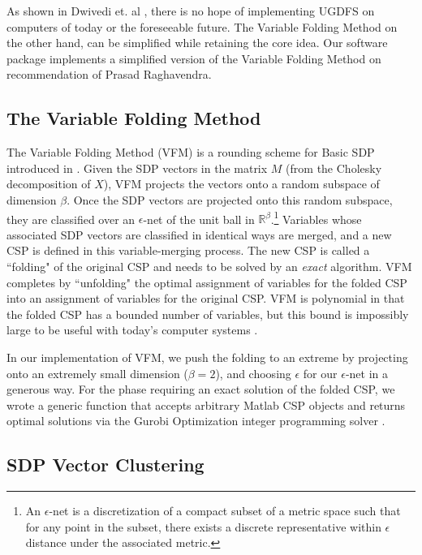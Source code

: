 \documentclass[12pt]{article} %
\begin{document}
As shown in Dwivedi et. al \cite{dwivedi2015introduction}, there is no hope of implementing UGDFS on computers of today or the foreseeable future. The Variable Folding Method on the other hand, can be simplified while retaining the core idea. Our software package implements a simplified version of the Variable Folding Method on recommendation of Prasad Raghavendra. 

\subsection{The Variable Folding Method}

The Variable Folding Method (VFM) is a rounding scheme for Basic SDP introduced in \cite{raghavendra2009round}. Given the SDP vectors in the matrix $M$ (from the Cholesky decomposition of $X$), VFM projects the vectors onto a random subspace of dimension $\beta$. Once the SDP vectors are projected onto this random subspace, they are classified over an $\epsilon$-net of the unit ball in $\mathbb{R}^\beta$.\footnote{An $\epsilon$-net is a discretization of a compact subset of a metric space such that for any point in the subset, there exists a discrete representative within $\epsilon$ distance under the associated metric.} Variables whose associated SDP vectors are classified in identical ways are merged, and a new CSP is defined in this variable-merging process. The new CSP is called a ``folding" of the original CSP and needs to be solved by an \textit{exact} algorithm. VFM completes by ``unfolding" the optimal assignment of variables for the folded CSP into an assignment of variables for the original CSP. VFM is polynomial in that the folded CSP has a bounded number of variables, but this bound is impossibly large to be useful with today's computer systems \citep{dwivedi2015introduction}. 

In our implementation of VFM, we push the folding to an extreme by projecting onto an extremely small dimension ($\beta = 2$), and choosing $\epsilon$ for our $\epsilon$-net in a generous way. For the phase requiring an exact solution of the folded CSP, we wrote a generic function that accepts arbitrary Matlab CSP objects and returns optimal solutions via the Gurobi Optimization integer programming solver \cite{gurobi}.

\subsection{SDP Vector Clustering}
\end{document}
